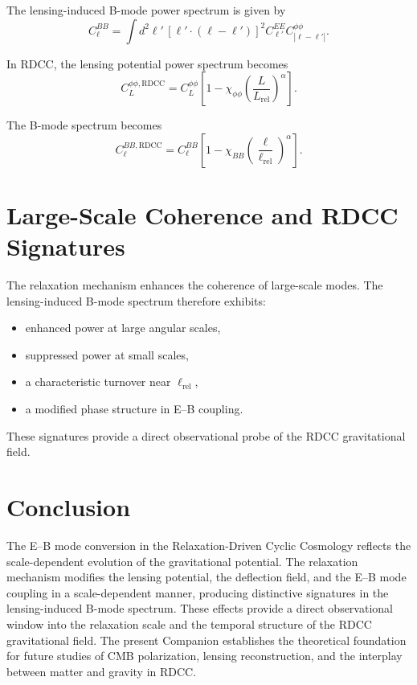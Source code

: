 \documentclass[11pt,a4paper]{article}
\begin{document}
The lensing-induced B-mode power spectrum is given by
\begin{equation}
    C_{\ell}^{BB}
    = \int d^{2}\ell'\,
      \left[
        \ell' \cdot (\ell - \ell')
      \right]^{2}
      C_{\ell'}^{EE}
      C_{|\ell - \ell'|}^{\phi\phi}.
\end{equation}

In RDCC, the lensing potential power spectrum becomes
\begin{equation}
    C_{L}^{\phi\phi,\mathrm{RDCC}}
    = C_{L}^{\phi\phi}
      \left[
        1 - \chi_{\phi\phi}
        \left(\frac{L}{L_{\mathrm{rel}}}\right)^{\alpha}
      \right].
\end{equation}

The B-mode spectrum becomes
\begin{equation}
    C_{\ell}^{BB,\mathrm{RDCC}}
    = C_{\ell}^{BB}
      \left[
        1 - \chi_{BB}
        \left(\frac{\ell}{\ell_{\mathrm{rel}}}\right)^{\alpha}
      \right].
\end{equation}
\section{Large-Scale Coherence and RDCC Signatures}

The relaxation mechanism enhances the coherence of large-scale modes. The 
lensing-induced B-mode spectrum therefore exhibits:

\begin{itemize}
    \item enhanced power at large angular scales,
    \item suppressed power at small scales,
    \item a characteristic turnover near $\ell_{\mathrm{rel}}$,
    \item a modified phase structure in E--B coupling.
\end{itemize}

These signatures provide a direct observational probe of the RDCC gravitational 
field.
\section{Conclusion}

The E--B mode conversion in the Relaxation-Driven Cyclic Cosmology reflects the 
scale-dependent evolution of the gravitational potential. The relaxation mechanism 
modifies the lensing potential, the deflection field, and the E--B mode coupling in 
a scale-dependent manner, producing distinctive signatures in the lensing-induced 
B-mode spectrum. These effects provide a direct observational window into the 
relaxation scale and the temporal structure of the RDCC gravitational field. The 
present Companion establishes the theoretical foundation for future studies of CMB 
polarization, lensing reconstruction, and the interplay between matter and gravity 
in RDCC.


\nocite{*}

\end{document}

